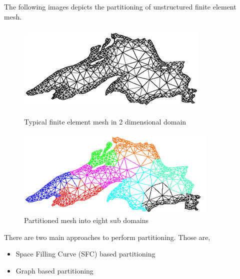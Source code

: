 \documentclass[a0,landscape]{a0poster}
\begin{document}
\begin{multicols}{4}
The following images depicts the partitioning of unstructured finite element mesh. 

\begin{figure}[H]
\includegraphics[width=\linewidth,keepaspectratio]{usMesh_wo_partitioning.png}
\caption{ Typical finite element mesh in 2 dimensional domain \label{usMesh_wo_partitioning}}
\endminipage\hfil
{}
\includegraphics[width=\linewidth,keepaspectratio]{usMesh_w_partitioning.png}
\caption{ Partitioned mesh into eight sub domains \label{usMesh_w_partitioning}}
\endminipage\hfill
\end{figure}

There are two main approaches to perform partitioning\cite{Boman:2012:ZIP:2590399.2590404}. Those are, 
\begin{itemize}
 \item Space Filling Curve (SFC) based partitioning
 \item Graph based partitioning
\end{itemize}


\end{multicols}
\end{document}
